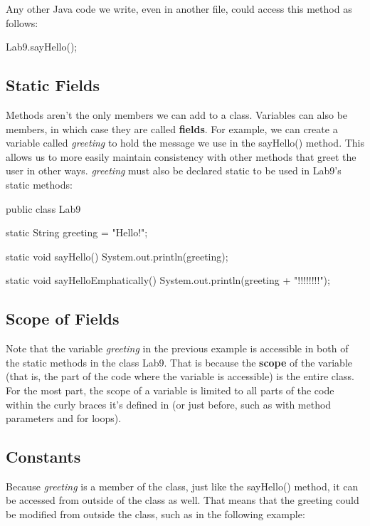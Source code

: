 Any other Java code we write, even in another file, could access this method as follows:

\begin{code}
Lab9.sayHello();
\end{code}



\subsection{Static Fields}

Methods aren't the only members we can add to a class. Variables can also be members, in which case they are called \textbf{fields}. For example, we can create a variable called \textit{greeting} to hold the message we use in the sayHello() method. This allows us to more easily maintain consistency with other methods that greet the user in other ways. \textit{greeting} must also be declared static to be used in Lab9's static methods: 


\begin{code}
public class Lab9 {
  static String greeting = "Hello!";

  static void sayHello() {
    System.out.println(greeting);
  }

  static void sayHelloEmphatically() {
    System.out.println(greeting + "!!!!!!!!");
  }
}
\end{code}

\subsection{Scope of Fields} 

Note that the variable \textit{greeting} in the previous example is accessible in both of the static methods in the class Lab9. That is because the \textbf{scope} of the variable (that is, the part of the code where the variable is accessible) is the entire class. For the most part, the scope of a variable is limited to all parts of the code within the curly braces it's defined in (or just before, such as with method parameters and for loops). 

\subsection{Constants}

Because \textit{greeting} is a member of the class, just like the sayHello() method, it can be accessed from outside of the class as well. That means that the greeting could be modified from outside the class, such as in the following example:

